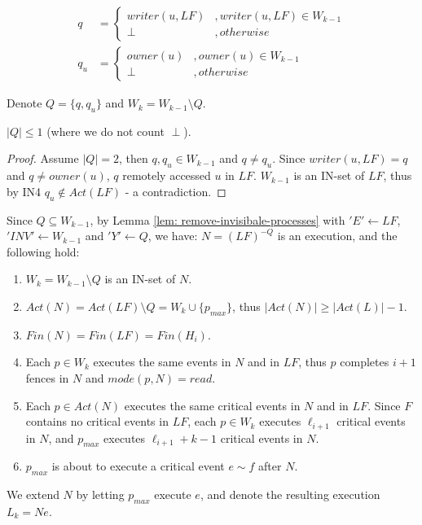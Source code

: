 \begin{align*}
q & = \begin{cases}
	writer(u, L F) & ,writer(u, L F) \in W_{k-1}
	\\ \perp & ,otherwise
	\end{cases}
\\
q_u & = \begin{cases}
	owner(u) & ,owner(u) \in W_{k-1}
	\\ \perp & ,otherwise
	\end{cases}
\end{align*}

Denote $Q = \{q,q_u\}$ and $W_k = W_{k-1} \setminus Q$.
\begin{claim-subsection}
\label{claim:subsection}
	$|Q| \leq 1$ (where we do not count $\perp$).
\end{claim-subsection}
\begin{proof}
	Assume $|Q| = 2$, then $q,q_u \in W_{k-1}$ and $q \neq q_u$. Since $writer(u, L F) = q$ and $q \neq owner(u)$, $q$ remotely accessed $u$ in $L F$. $W_{k-1}$ is an IN-set of $L F$, thus by IN4 $q_u \notin Act(L F)$ - a contradiction.
\end{proof}

Since $Q \subseteq W_{k-1}$, by Lemma \ref{lem: remove-invisibale-processes} with $'E' \leftarrow L F$, $'INV' \leftarrow W_{k-1}$ and $'Y' \leftarrow Q$, we have: $N = (L F)^{-Q}$ is an execution, and the following hold:
\begin{enumerate}
	\item $W_k = W_{k-1} \setminus Q$ is an IN-set of $N$.
	\item $Act(N) = Act(L F) \setminus Q = W_k \cup \{p_{max}\}$, thus $|Act(N)| \geq |Act(L)| - 1$.
	\item $Fin(N) = Fin(L F) = Fin(H_i)$.
	\item Each $p \in W_k$ executes the same events in $N$ and in $L F$, thus $p$ completes $i+1$ fences in $N$ and $mode(p,N) = read$.
	\item Each $p \in Act(N)$ executes the same critical events in $N$ and in $L F$. Since $F$ contains no critical events in $L F$, each $p \in W_k$ executes $\ell_{i+1}$ critical events in $N$, and $p_{max}$ executes $\ell_{i+1}+k-1$ critical events in $N$.
	\item $p_{max}$ is about to execute a critical event $e \sim f$ after $N$.
\end{enumerate}

We extend $N$ by letting $p_{max}$ execute $e$, and denote the resulting execution $L_k = N e$.

